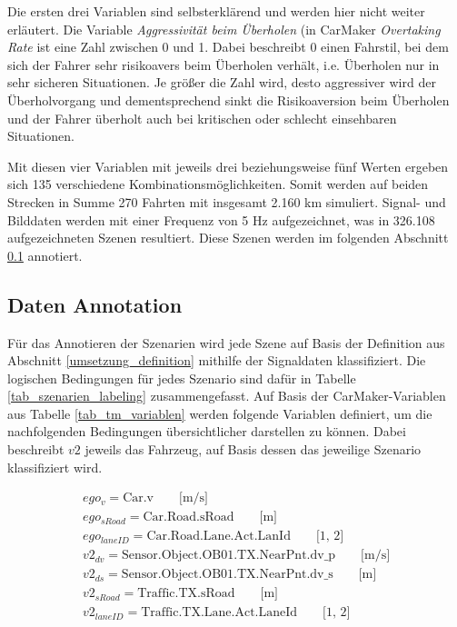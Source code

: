 Die ersten drei Variablen sind selbsterklärend und werden hier nicht weiter erläutert. Die Variable \textit{Aggressivität beim Überholen} (in CarMaker \textit{Overtaking Rate} ist eine Zahl zwischen 0 und 1. Dabei beschreibt 0 einen Fahrstil, bei dem sich der Fahrer sehr risikoavers beim Überholen verhält, i.e. Überholen nur in sehr sicheren Situationen. Je größer die Zahl wird, desto aggressiver wird der Überholvorgang und dementsprechend sinkt die Risikoaversion beim Überholen und der Fahrer überholt auch bei kritischen oder schlecht einsehbaren Situationen.

Mit diesen vier Variablen mit jeweils drei beziehungsweise fünf Werten ergeben sich 135 verschiedene Kombinationsmöglichkeiten. Somit werden auf beiden Strecken in Summe 270 Fahrten mit insgesamt 2.160 km simuliert. Signal- und Bilddaten werden mit einer Frequenz von 5 Hz aufgezeichnet, was in 326.108 aufgezeichneten Szenen resultiert. Diese Szenen werden im folgenden Abschnitt \ref{umsetzung_daten_synth_labeling} annotiert.


\subsection{Daten Annotation}
\label{umsetzung_daten_synth_labeling}

Für das Annotieren der Szenarien wird jede Szene auf Basis der Definition aus Abschnitt \ref{umsetzung_definition} mithilfe der Signaldaten klassifiziert. Die logischen Bedingungen für jedes Szenario sind dafür in Tabelle \ref{tab_szenarien_labeling} zusammengefasst. Auf Basis der CarMaker-Variablen aus Tabelle \ref{tab_tm_variablen} werden folgende Variablen definiert, um die nachfolgenden Bedingungen übersichtlicher darstellen zu können. Dabei beschreibt $v2$ jeweils das Fahrzeug, auf Basis dessen das jeweilige Szenario klassifiziert wird.

\begin{equation*}
\begin{split}
ego_v = \text{Car.v} \qquad \text{[m/s]} \\
ego_{sRoad} = \text{Car.Road.sRoad} \qquad \text{[m]} \\
ego_{laneID} = \text{Car.Road.Lane.Act.LanId} \qquad \text{[1, 2]} \\
v2_{dv} = \text{Sensor.Object.OB01.TX.NearPnt.dv\_p} \qquad \text{[m/s]} \\
v2_{ds} = \text{Sensor.Object.OB01.TX.NearPnt.dv\_s} \qquad \text{[m]} \\
v2_{sRoad} = \text{Traffic.TX.sRoad} \qquad \text{[m]} \\
v2_{laneID} = \text{Traffic.TX.Lane.Act.LaneId} \qquad \text{[1, 2]} \\
\end{split}
\end{equation*}

